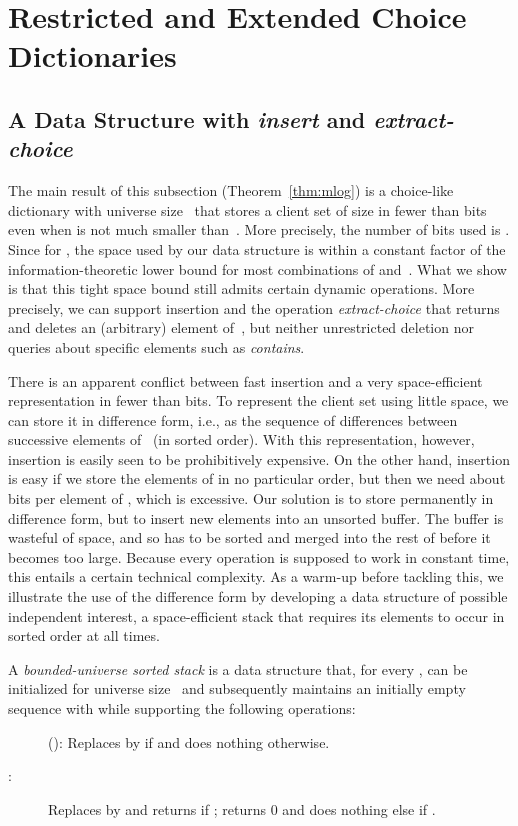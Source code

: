 \documentclass[envcountsame,envcountsect,undated,nolinenumbers]{lnthi}
\def\Tvn#1{\hbox{\textit{#1\/}}}
\begin{document}
\section{Restricted and Extended Choice Dictionaries}
\label{sec:other}

\subsection{A Data Structure with \Tvn{insert} and
 \Tvn{extract-choice}}
\label{subsec:mlog}

The main result of this subsection (Theorem~\ref{thm:mlog})
is a choice-like dictionary with universe size~
that stores a client set  of size 
in fewer than  bits even when  is not much
smaller than~.
More precisely, the number of bits used is
.
Since  for , the space used by our
data structure is within a constant factor of the
information-theoretic lower bound for most
combinations of  and~.
What we show is that this tight space bound still
admits certain dynamic operations.
More precisely, we can support insertion and the
operation \Tvn{extract-choice} that returns and
deletes an (arbitrary) element of~,
but neither unrestricted deletion nor queries
about specific elements such as \Tvn{contains}.

There is an apparent conflict between fast insertion
and a very space-efficient representation in
fewer than  bits.
To represent the client set  using little space, we
can store it in difference form, i.e., as the sequence of
differences between successive elements of~
(in sorted order).
With this representation, however, insertion is
easily seen to be prohibitively expensive.
On the other hand, insertion is easy if we store the
elements of  in no particular order, but then we
need about  bits per element of ,
which is excessive.
Our solution is to store  permanently in
difference form, but to insert new elements into an
unsorted buffer.
The buffer is wasteful of space, and so has to be
sorted and merged into the rest of  before it
becomes too large.
Because every operation is supposed to work in constant time,
this entails a certain technical complexity.
As a warm-up before tackling this, we illustrate the
use of the difference form by developing a data
structure of possible independent interest, a
space-efficient stack that requires its elements
to occur in sorted order at all times.

\begin{definition}
A \emph{bounded-universe sorted stack} is a data structure that,
for every , can be
initialized for universe size~ and
subsequently maintains an initially empty
sequence  with
 while supporting
the following operations:

\begin{description}
\item[\normalfont]
():
Replaces  by 
if  and does nothing otherwise.
\item[\normalfont:]
Replaces  by 
and returns  if ; returns 0 and
does nothing else if .
\end{description}
\end{definition}
\end{document}
